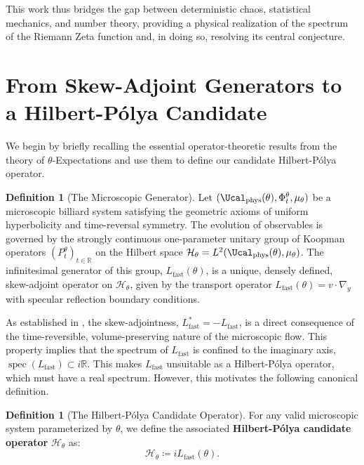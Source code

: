 \documentclass[12pt, letterpaper]{amsart}
\theoremstyle{plain}
\theoremstyle{definition}
\newtheorem{definition}[theorem]{Definition}
\theoremstyle{remark}
\newcommand{\Lfast}{L_{\text{fast}}}
\newcommand{\Hcaltheta}{\mathcal{H}_\theta}
\newcommand{\R}{\mathbb{R}}
\DeclareMathOperator{\spec}{spec}
\begin{document}
This work thus bridges the gap between deterministic chaos, statistical mechanics, and number theory, providing a physical realization of the spectrum of the Riemann Zeta function and, in doing so, resolving its central conjecture.

\section{From Skew-Adjoint Generators to a Hilbert-Pólya Candidate}

We begin by briefly recalling the essential operator-theoretic results from the theory of $\theta$-Expectations \cite{Qi2025} and use them to define our candidate Hilbert-Pólya operator.

\begin{definition}[The Microscopic Generator]
Let $(\Ucal_{\mathrm{phys}}(\theta), \Phi_t^\theta, \mu_\theta)$ be a microscopic billiard system satisfying the geometric axioms of uniform hyperbolicity and time-reversal symmetry. The evolution of observables is governed by the strongly continuous one-parameter unitary group of Koopman operators $(P_t^\theta)_{t \in \R}$ on the Hilbert space $\Hcaltheta = L^2(\Ucal_{\mathrm{phys}}(\theta), \mu_\theta)$. The infinitesimal generator of this group, $\Lfast(\theta)$, is a unique, densely defined, skew-adjoint operator on $\Hcaltheta$, given by the transport operator $\Lfast(\theta) = v \cdot \nabla_y$ with specular reflection boundary conditions.
\end{definition}

As established in \cite{Qi2025}, the skew-adjointness, $\Lfast^* = -\Lfast$, is a direct consequence of the time-reversible, volume-preserving nature of the microscopic flow. This property implies that the spectrum of $\Lfast$ is confined to the imaginary axis, $\spec(\Lfast) \subset i\R$. This makes $\Lfast$ unsuitable as a Hilbert-Pólya operator, which must have a real spectrum. However, this motivates the following canonical definition.

\begin{definition}[The Hilbert-Pólya Candidate Operator]
For any valid microscopic system parameterized by $\theta$, we define the associated \textbf{Hilbert-Pólya candidate operator} $\mathcal{H}_\theta$ as:
\begin{equation}
    \mathcal{H}_\theta \coloneqq i \Lfast(\theta).
\end{equation}
\end{definition}
\end{document}
